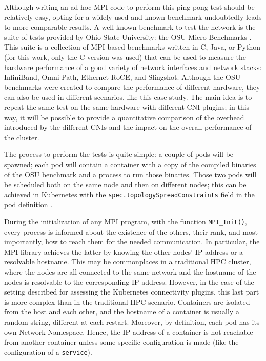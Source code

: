 Although writing an ad-hoc MPI code to perform this ping-pong test should be
relatively easy, opting for a widely used and known benchmark undoubtedly leads
to more comparable results. A well-known benchmark to test the network is the
suite of tests provided by Ohio State University: the OSU Micro-Benchmarks
\cite{osu}.
This suite is a collection of MPI-based benchmarks written in C, Java, or Python
(for this work, only the C version was used) that can be used to measure the
hardware performance of a good variety of network interfaces and network stacks:
InfiniBand, Omni-Path, Ethernet RoCE, and Slingshot.
Although the OSU benchmarks were created to compare the performance of different
hardware, they can also be used in different scenarios, like this case study.
The main idea is to repeat the same test on the same hardware with different CNI
plugins; in this way, it will be possible to provide a quantitative comparison
of the overhead introduced by the different CNIs and the impact on the overall
performance of the cluster.

The process to perform the tests is quite simple: a couple of pods will be
spawned; each pod will contain a container with a copy of the compiled binaries
of the OSU benchmark and a process to run those binaries.
Those two pods will be scheduled both on the same node and then on different
nodes; this can be achieved in Kubernetes with the
\texttt{spec.topologySpreadConstraints} field in the pod definition
\cite{kdoc-topologyconstraints}.

During the initialization of any MPI program, with the function
\texttt{MPI\_Init()}, every process is informed about the existence of the
others, their rank, and most importantly, how to reach them for the needed
communication. In particular, the MPI library achieves the latter by knowing the
other nodes' IP address or a resolvable hostname.
This may be commonplaces in a traditional HPC cluster, where the nodes are all
connected to the same network and the hostname of the nodes is resolvable to the
corresponding IP address. However, in the case of the setting described for
assessing the Kubernetes connectivity plugins, this last part is more complex
than in the traditional HPC scenario.
Containers are isolated from the host and each other, and the hostname of a
container is usually a random string, different at each restart.
Moreover, by definition, each pod has its own Network Namespace. Hence, the IP
address of a container is not reachable from another container unless some
specific configuration is made (like the configuration of a \texttt{service}).

